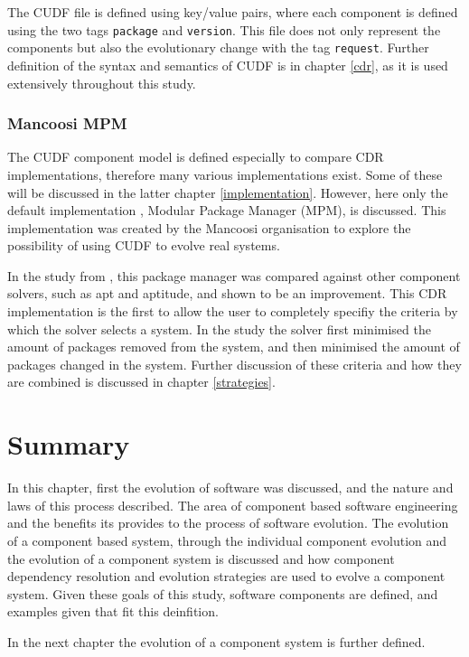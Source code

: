 The CUDF file is defined using key/value pairs, where each component is defined using the two tags \verb+package+ and \verb+version+.
This file does not only represent the components but also the evolutionary change with the tag \verb+request+.
Further definition of the syntax and semantics of CUDF is in chapter \ref{cdr}, as it is used extensively throughout this study.

\subsubsection{Mancoosi MPM}
The CUDF component model is defined especially to compare CDR implementations, therefore many various implementations exist.
Some of these will be discussed in the latter chapter \ref{implementation}.
However, here only the default implementation , Modular Package Manager \citep{abate2011} (MPM), is discussed.
This implementation was created by the Mancoosi organisation to explore the possibility of using CUDF to evolve real systems.

In the study from \cite{abate2011}, this package manager was compared against other component solvers, such as apt and aptitude, and shown to be an improvement.
This CDR implementation is the first to allow the user to completely specifiy the criteria by which the solver selects a system.
In the study the solver first minimised the amount of packages removed from the system, and then minimised the amount of packages changed in the system.
Further discussion of these criteria and how they are combined is discussed in chapter \ref{strategies}. 

\section{Summary}

In this chapter, first the evolution of software was discussed, and the nature and laws of this process described.
The area of component based software engineering and the benefits its provides to the process of software evolution.
The evolution of a component based system, through the individual component evolution and the evolution of a component system is discussed
and how component dependency resolution and evolution strategies are used to evolve a component system.
Given these goals of this study, software components are defined, and examples given that fit this deinfition.

In the next chapter the evolution of a component system is further defined.

